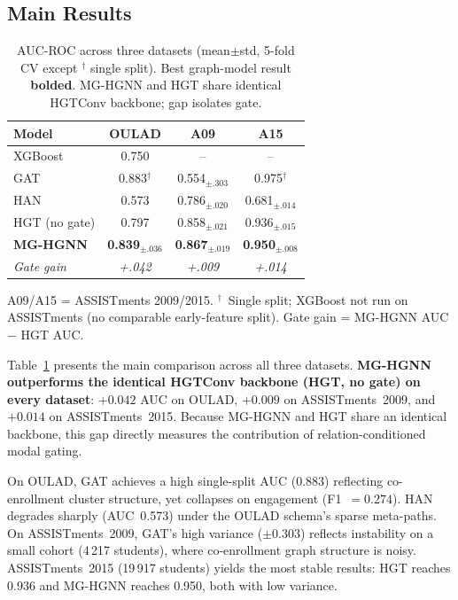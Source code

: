 \documentclass[sigconf]{acmart}
\begin{document}
\subsection{Main Results}

\begin{table}[t]
\centering
\small
\caption{AUC-ROC across three datasets (mean$\pm$std,
5-fold CV except $^\dagger$ single split). Best
graph-model result \textbf{bolded}. MG-HGNN and HGT
share identical HGTConv backbone; gap isolates gate.}
\label{tab:main_results}
\begin{tabular}{lccc}
\toprule
\textbf{Model} & \textbf{OULAD} & \textbf{A09} & \textbf{A15} \\
\midrule
XGBoost        & 0.750  & --    & -- \\
GAT            & 0.883$^\dagger$ & 0.554$_{\pm.303}$ & 0.975$^\dagger$ \\
HAN            & 0.573  & 0.786$_{\pm.020}$ & 0.681$_{\pm.014}$ \\
HGT (no gate)  & 0.797  & 0.858$_{\pm.021}$ & 0.936$_{\pm.015}$ \\
\midrule
\textbf{MG-HGNN}
  & \textbf{0.839}$_{\pm.036}$
  & \textbf{0.867}$_{\pm.019}$
  & \textbf{0.950}$_{\pm.008}$ \\
\midrule
\textit{Gate gain}
  & \textit{+.042} & \textit{+.009} & \textit{+.014} \\
\bottomrule
\end{tabular}
\par\smallskip
{\footnotesize A09/A15 = ASSISTments 2009/2015.
$^\dagger$~Single split; XGBoost not run on
ASSISTments (no comparable early-feature split).
Gate gain = MG-HGNN AUC $-$ HGT AUC.}
\end{table}

Table~\ref{tab:main_results} presents the main comparison
across all three datasets. \textbf{MG-HGNN outperforms
the identical HGTConv backbone (HGT, no gate) on every
dataset}: $+0.042$ AUC on OULAD, $+0.009$ on
ASSISTments~2009, and $+0.014$ on ASSISTments~2015.
Because MG-HGNN and HGT share an identical backbone,
this gap directly measures the contribution of
relation-conditioned modal gating.

On OULAD, GAT achieves a high single-split AUC (0.883)
reflecting co-enrollment cluster structure, yet collapses
on engagement (F1~$= 0.274$). HAN degrades sharply
(AUC~0.573) under the OULAD schema's sparse meta-paths.
On ASSISTments~2009, GAT's high variance
($\pm 0.303$) reflects instability on a small cohort
(4\,217 students), where co-enrollment graph structure
is noisy. ASSISTments~2015 (19\,917 students) yields
the most stable results: HGT reaches 0.936 and
MG-HGNN reaches 0.950, both with low variance.
\end{document}
